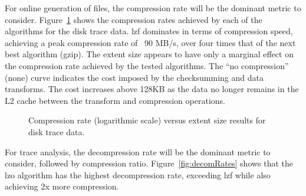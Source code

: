 For online generation of \DataSeries{} files, the compression rate will
be the dominant metric to consider.  Figure~\ref{fig:comRates} shows the compression rates achieved by
each of the algorithms for the disk trace data.  
lzf dominates in terms of compression speed, achieving 
a peak compression rate of ~90 MB/s, over four times
that of the next best algorithm (gzip).  The extent size appears to
have only a marginal effect on the compression rate achieved by the 
tested algorithms.  The ``no
compression'' (none) curve indicates the cost imposed
by the checksumming and data transforms.  The cost increases above 128KB 
as the data no longer remains in the L2 cache between the transform and
compression operations.


\begin{figure}[tbh]
\caption{ Compression rate (logarithmic scale) versus extent size results for disk trace data.}
\label{fig:comRates}
\end{figure}

For trace analysis, the decompression rate will be the dominant metric to
consider, followed by compression ratio.
Figure~\ref{fig:decomRates} shows that the lzo algorithm has the
highest decompression rate, exceeding lzf while also achieving 
2x more compression.  

